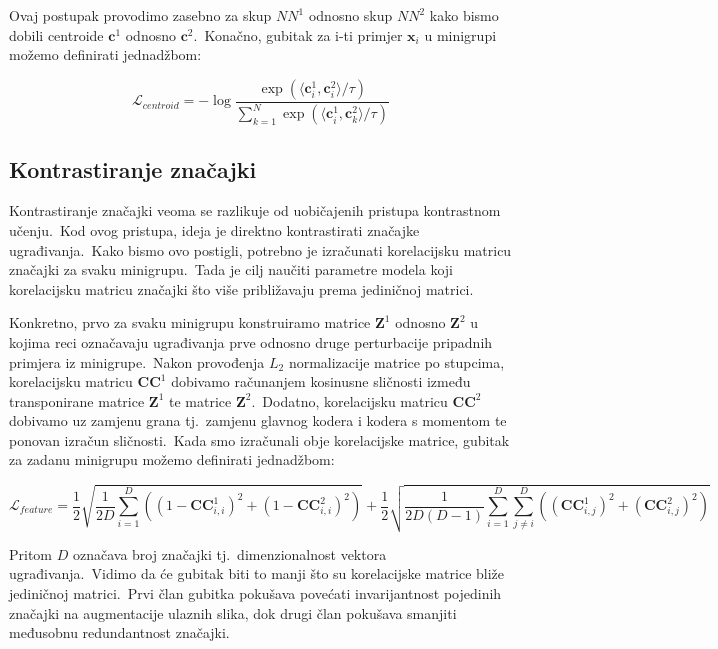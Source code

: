 \documentclass[diplomskirad]{fer}
\begin{document}
\pagebreak

Ovaj postupak provodimo zasebno za skup $NN^1$ odnosno skup $NN^2$ kako bismo dobili centroide $\bm{c}^1$ odnosno $\bm{c}^2$.\ Konačno, gubitak za i-ti primjer $\bm{x}_i$ u minigrupi možemo definirati jednadžbom:

\begin{equation}
  \mathcal{L}_{centroid} = - \log{\frac{\exp(\langle \bm{c}_{i}^{1}, \bm{c}_{i}^{2} \rangle / \tau)}{\sum_{k=1}^{N}{\exp(\langle \bm{c}_{i}^{1}, \bm{c}_{k}^{2} \rangle / \tau)}}}
  \label{eq:centroid_loss}
\end{equation}

\subsection{Kontrastiranje značajki}
\label{sub:features}
  
Kontrastiranje značajki veoma se razlikuje od uobičajenih pristupa kontrastnom učenju.\ Kod ovog pristupa, ideja je direktno kontrastirati značajke ugrađivanja.\ 
Kako bismo ovo postigli, potrebno je izračunati korelacijsku matricu značajki za svaku minigrupu.\ Tada je cilj naučiti parametre modela koji korelacijsku matricu značajki što više približavaju prema jediničnoj matrici.\ 

Konkretno, prvo za svaku minigrupu konstruiramo matrice $\bm{Z}^1$ odnosno $\bm{Z}^2$ u kojima reci označavaju ugrađivanja prve odnosno druge perturbacije pripadnih primjera iz minigrupe.\ 
Nakon provođenja $L_2$ normalizacije matrice po stupcima, korelacijsku matricu $\bm{CC}^1$ dobivamo računanjem kosinusne sličnosti između transponirane matrice $\bm{Z}^1$ te matrice $\bm{Z}^2$.\ 
Dodatno, korelacijsku matricu $\bm{CC}^2$ dobivamo uz zamjenu grana tj.\ zamjenu glavnog kodera i kodera s momentom te ponovan izračun sličnosti.\ 
Kada smo izračunali obje korelacijske matrice, gubitak za zadanu minigrupu možemo definirati jednadžbom:

\begin{equation}
  \mathcal{L}_{feature} = \frac{1}{2} \sqrt{\frac{1}{2D}\sum_{i=1}^{D}((1 - \bm{CC}_{i,i}^1)^2 + (1 - \bm{CC}_{i,i}^2)^2)} + \frac{1}{2} \sqrt{\frac{1}{2D(D - 1)}\sum_{i=1}^{D}\sum_{j \neq i}^{D}((\bm{CC}_{i,j}^1)^2 + (\bm{CC}_{i,j}^2)^2)}
  \label{eq:feature_loss}
\end{equation}

Pritom $D$ označava broj značajki tj.\ dimenzionalnost vektora ugrađivanja.\ Vidimo da će gubitak biti to manji što su korelacijske matrice bliže jediničnoj matrici.\ 
Prvi član gubitka pokušava povećati invarijantnost pojedinih značajki na augmentacije ulaznih slika, dok drugi član pokušava smanjiti međusobnu redundantnost značajki.\ 
\end{document}
